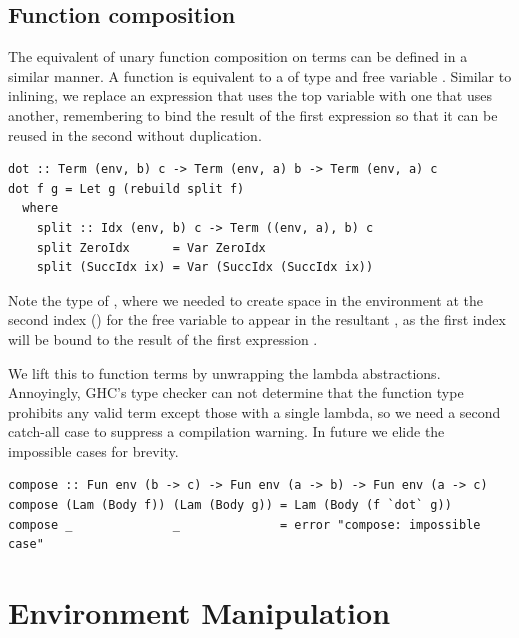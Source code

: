 
\subsection{Function composition}
\label{sec:function_composition}

The equivalent of unary function composition  on terms can be
defined in a similar manner. A function  is equivalent to a
 of type  and free variable . Similar to inlining, we
replace an expression that uses the top variable with one that uses another,
remembering to bind the result of the first expression so that it can be reused
in the second without duplication.
%
\begin{lstlisting}[style=haskell
    ,name=function_composition
    ,caption={[A simultaneous substitution to compose unary function terms]}]
dot :: Term (env, b) c -> Term (env, a) b -> Term (env, a) c
dot f g = Let g (rebuild split f)
  where
    split :: Idx (env, b) c -> Term ((env, a), b) c
    split ZeroIdx      = Var ZeroIdx
    split (SuccIdx ix) = Var (SuccIdx (SuccIdx ix))
\end{lstlisting}
%
Note the type of , where we needed to create space in the
environment at the second index () for the free variable
 to appear in the resultant , as the first index will be
bound to the result of the first expression .

We lift this to function terms by unwrapping the lambda abstractions.
Annoyingly, GHC's type checker can not determine that the function type
prohibits any valid term except those with a single lambda, so we need a second
catch-all case to suppress a compilation warning. In future we elide the
impossible cases for brevity.
%
\begin{lstlisting}[style=haskell,
    name=function_composition,
    caption={A simultaneous substitution to compose unary function terms}]
compose :: Fun env (b -> c) -> Fun env (a -> b) -> Fun env (a -> c)
compose (Lam (Body f)) (Lam (Body g)) = Lam (Body (f `dot` g))
compose _              _              = error "compose: impossible case"
\end{lstlisting}


\section{Environment Manipulation}
\label{sec:environment_manipulation}


